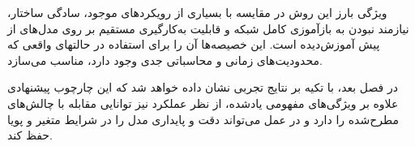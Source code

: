 ویژگی بارز این روش در مقایسه با بسیاری از رویکردهای موجود، سادگی ساختار، نیازمند نبودن به بازآموزی کامل شبکه و قابلیت به‌کارگیری مستقیم بر روی مدل‌های از پیش آموزش‌دیده است. این خصیصه‌ها آن را برای استفاده در حالتهای واقعی که محدودیت‌های زمانی و محاسباتی جدی وجود دارد، مناسب می‌سازد.  

در فصل بعد، با تکیه بر نتایج تجربی نشان داده خواهد شد که این چارچوب پیشنهادی علاوه بر ویژگی‌های مفهومی یادشده، از نظر عملکرد نیز توانایی مقابله با چالش‌های مطرح‌شده را دارد و در عمل می‌تواند دقت و پایداری مدل را در شرایط متغیر و پویا حفظ کند.